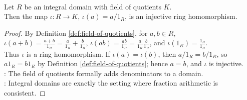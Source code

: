\begin{proposition} \label{prop:field-of-quotients-embeds-domain} \\
Let $R$ be an integral domain with field of quotients $K$.\\
Then the map $\iota:R\to K$, $\iota(a)=a/1_R$, is an injective ring homomorphism.
\begin{proof}
By Definition \ref{def:field-of-quotients}, for $a,b\in R$, $\iota(a+b)=\frac{a+b}{1_R}=\frac{a}{1_R}+\frac{b}{1_R}$, $\iota(ab)=\frac{ab}{1_R}=\frac{a}{1_R}\frac{b}{1_R}$, and $\iota(1_R)=\frac{1_R}{1_R}$.\\
Thus $\iota$ is a ring homomorphism. If $\iota(a)=\iota(b)$, then $a/1_R=b/1_R$, so $a1_R=b1_R$ by Definition \ref{def:field-of-quotients}; hence $a=b$, and $\iota$ is injective.\\
: The field of quotients formally adds denominators to a domain.\\
: Integral domains are exactly the setting where fraction arithmetic is consistent.
\end{proof}
\end{proposition}
